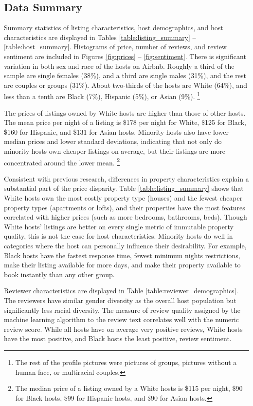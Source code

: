 \subsection{Data Summary}

Summary statistics of listing characteristics, host demographics, and host characteristics are displayed in Tables \ref{table:listing_summary} -- \ref{table:host_summary}. Histograms of price, number of reviews, and review sentiment are included in Figures \ref{fig:prices} -- \ref{fig:sentiment}. There is significant variation in both sex and race of the hosts on Airbnb. Roughly a third of the sample are single females (38\%), and a third are single males (31\%), and the rest are couples or groups (31\%). About two-thirds of the hosts are White (64\%), and less than a tenth are Black (7\%), Hispanic (5\%), or Asian (9\%).%
	\footnote{The rest of the profile pictures were pictures of groups, pictures without a human face, or multiracial couples.} 

The prices of listings owned by White hosts are higher than those of other hosts. The mean price per night of a listing is \$178 per night for White, \$125 for Black, \$160 for Hispanic, and \$131 for Asian hosts. Minority hosts also have lower median prices and lower standard deviations, indicating that not only do minority hosts own cheaper listings on average, but their listings are more concentrated around the lower mean.%
	\footnote{The median price of a listing owned by a White hosts is \$115 per night, \$90 for Black hosts, \$99 for Hispanic hosts, and \$90 for Asian hosts.} 

Consistent with previous research, differences in property characteristics explain a substantial part of the price disparity. Table \ref{table:listing_summary} shows that White hosts own the most costly property type (houses) and the fewest cheaper property types (apartments or lofts), and their properties have the most features correlated with higher prices (such as more bedrooms, bathrooms, beds). Though White hosts' listings are better on every single metric of immutable property quality, this is not the case for host characteristics. Minority hosts do well in categories where the host can personally influence their desirability. For example, Black hosts have the fastest response time, fewest minimum nights restrictions, make their listing available for more days, and make their property available to book instantly than any other group.  

Reviewer characteristics are displayed in Table \ref{table:reviewer_demographics}. The reviewers have similar gender diversity as the overall host population but significantly less racial diversity. The measure of review quality assigned by the machine learning algorithm to the review text correlates well with the numeric review score. While all hosts have on average very positive reviews, White hosts have the most positive, and Black hosts the least positive, review sentiment. 




